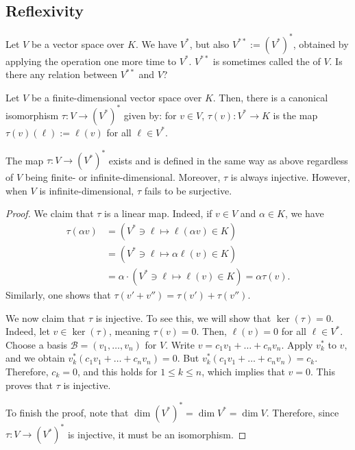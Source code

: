 \subsection{Reflexivity}
Let $V$ be a vector space over $K$. We have $V^*$, but also $V^{**} := (V^*)^*$, obtained by applying the  operation one more time to $V^*$. $V^{**}$ is sometimes called the  of $V$. Is there any relation between $V^{**}$ and $V$?

\begin{theorem}
  Let $V$ be a finite-di\-men\-sional vector space over $K$. Then, there is a canonical isomorphism $\tau \colon V \to (V^*)^*$ given by: for $v \in V$, $\tau(v) \colon V^* \to K$ is the map $\tau(v)(\ell) := \ell(v)$ for all $\ell \in V^*$.
\end{theorem}

\begin{remark}
  The map $\tau \colon V \to (V^*)^*$ exists and is defined in the same way as above regardless of $V$ being finite- or infinite-dimensional. Moreover, $\tau$ is always injective. However, when $V$ is infinite-dimensional, $\tau$ fails to be surjective.
\end{remark}

\begin{proof}
  We claim that $\tau$ is a linear map. Indeed, if $v \in V$ and $\alpha \in K$, we have
  \begin{align*}
    \tau(\alpha v) &= (V^* \ni \ell \mapsto \ell(\alpha v) \in K) \\
    &= (V^* \ni \ell \mapsto \alpha \ell(v) \in K) \\
    &= \alpha \cdot (V^* \ni \ell \mapsto \ell(v) \in K) = \alpha \tau(v).
  \end{align*}
  Similarly, one shows that $\tau(v' + v'') = \tau(v') + \tau(v'')$.

  We now claim that $\tau$ is injective. To see this, we will show that $\ker(\tau) = 0$. Indeed, let $v \in \ker(\tau)$, meaning $\tau(v) = 0$. Then, $\ell(v) = 0$ for all $\ell \in V^*$. Choose a basis $\mathcal{B} = (v_1, \dots, v_n)$ for $V$. Write $v = c_1 v_1 + \dots + c_n v_n$. Apply $v_k^*$ to $v$, and we obtain $v_k^*(c_1 v_1 + \dots + c_n v_n) = 0$. But $v_k^*(c_1 v_1 + \dots + c_n v_n) = c_k$. Therefore, $c_k = 0$, and this holds for $1 \leq k \leq n$, which implies that $v = 0$. This proves that $\tau$ is injective.

  To finish the proof, note that $\dim(V^*)^* = \dim V^* = \dim V$. Therefore, since $\tau \colon V \to (V^*)^*$ is injective, it must be an isomorphism.
\end{proof}

